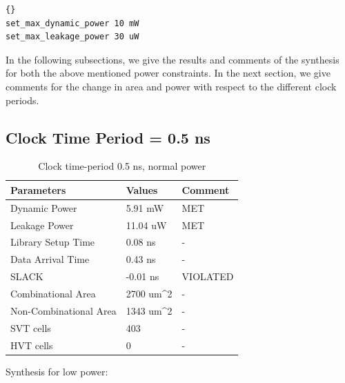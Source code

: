 \documentclass[11pt,a4paper]{article}
\begin{document}
\begin{lstlisting}[frame=trbl]{}
set_max_dynamic_power 10 mW
set_max_leakage_power 30 uW
\end{lstlisting}
\vspace{0.5cm}

In the following subsections, we give the results and comments of the synthesis for both the above mentioned power constraints. In the next section, we give comments for the change in area and power with respect to the different clock periods.

\newpage
\subsection{Clock Time Period = 0.5 ns}
\begin{table}[htbp]
\begin{center}
\begin{tabular}{|l|l|l|}
\hline
\textbf{Parameters}	& \textbf{Values}		& \textbf{Comment}\\ \hline
Dynamic Power				&	5.91 mW				& MET\\ \hline
Leakage Power 			&	11.04 uW			& MET\\ \hline
Library Setup Time  & 0.08 ns				& - \\ \hline
Data Arrival Time		& 0.43 ns				& - \\ \hline
SLACK								& -0.01 ns			& VIOLATED \\ \hline
Combinational Area	& 2700 um^2			& - \\ \hline
Non-Combinational Area	& 1343 um^2	& - \\ \hline
SVT cells						& 403						& - \\ \hline
HVT cells						& 0							& - \\ \hline
\end{tabular}
\end{center}
\caption{Clock time-period 0.5 ns, normal power}
\label{tab:syn0.5.1}
\end{table}

Synthesis for low power:
\end{document}
